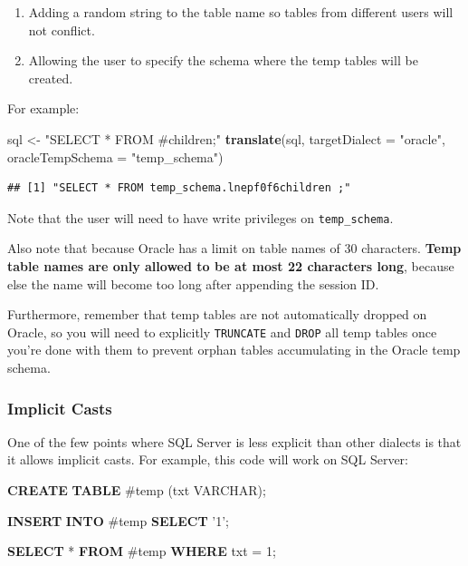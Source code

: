 \documentclass[11pt]{book}
\newenvironment{Shaded}{\begin{snugshade}}{\end{snugshade}}
\newcommand{\KeywordTok}[1]{\textcolor[rgb]{0.13,0.29,0.53}{\textbf{#1}}}
\newcommand{\DataTypeTok}[1]{\textcolor[rgb]{0.13,0.29,0.53}{#1}}
\newcommand{\DecValTok}[1]{\textcolor[rgb]{0.00,0.00,0.81}{#1}}
\newcommand{\StringTok}[1]{\textcolor[rgb]{0.31,0.60,0.02}{#1}}
\newcommand{\NormalTok}[1]{#1}
\providecommand{\tightlist}{%
  \setlength{\itemsep}{0pt}\setlength{\parskip}{0pt}}
\theoremstyle{definition}
\theoremstyle{definition}
\theoremstyle{definition}
\theoremstyle{remark}
\begin{document}
\begin{enumerate}
\def\labelenumi{\arabic{enumi}.}
\tightlist
\item
  Adding a random string to the table name so tables from different
  users will not conflict.
\item
  Allowing the user to specify the schema where the temp tables will be
  created.
\end{enumerate}

For example:

\begin{Shaded}
\begin{Highlighting}[]
\NormalTok{sql <-}\StringTok{ "SELECT * FROM #children;"}
\KeywordTok{translate}\NormalTok{(sql, }\DataTypeTok{targetDialect =} \StringTok{"oracle"}\NormalTok{, }\DataTypeTok{oracleTempSchema =} \StringTok{"temp_schema"}\NormalTok{)}
\end{Highlighting}
\end{Shaded}

\begin{verbatim}
## [1] "SELECT * FROM temp_schema.lnepf0f6children ;"
\end{verbatim}

Note that the user will need to have write privileges on
\texttt{temp\_schema}.

Also note that because Oracle has a limit on table names of 30
characters. \textbf{Temp table names are only allowed to be at most 22
characters long}, because else the name will become too long after
appending the session ID.

Furthermore, remember that temp tables are not automatically dropped on
Oracle, so you will need to explicitly \texttt{TRUNCATE} and
\texttt{DROP} all temp tables once you're done with them to prevent
orphan tables accumulating in the Oracle temp schema.

\subsubsection*{Implicit Casts}\label{implicit-casts}

One of the few points where SQL Server is less explicit than other
dialects is that it allows implicit casts. For example, this code will
work on SQL Server:

\begin{Shaded}
\begin{Highlighting}[]
\KeywordTok{CREATE} \KeywordTok{TABLE}\NormalTok{ #temp (txt }\DataTypeTok{VARCHAR}\NormalTok{);}

\KeywordTok{INSERT} \KeywordTok{INTO}\NormalTok{ #temp}
\KeywordTok{SELECT} \StringTok{'1'}\NormalTok{;}

\KeywordTok{SELECT}\NormalTok{ * }\KeywordTok{FROM}\NormalTok{ #temp }\KeywordTok{WHERE}\NormalTok{ txt = }\DecValTok{1}\NormalTok{;}
\end{Highlighting}
\end{Shaded}
\end{document}
